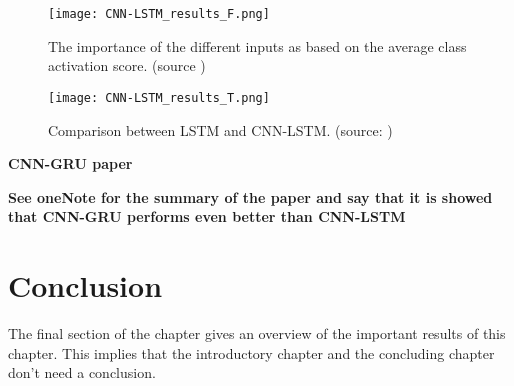 \begin{figure}[h!]
	\centering
	\texttt{[image: CNN-LSTM\_results\_F.png]}
	\caption{The importance of the different inputs as based on the average class activation score. (source \cite{Kim2019})}
	\label{tab:LSTM_lit_results}
\end{figure}

\begin{figure}[h!]
	\centering
	\texttt{[image: CNN-LSTM\_results\_T.png]}
	\caption{Comparison between LSTM and CNN-LSTM. (source: \cite{Kim2019})}
	\label{tab:LSTM_lit_results}
\end{figure}

\textbf{CNN-GRU paper}\\
\cite{Sajjad2020}

\textbf{See oneNote for the summary of the paper and say that it is showed that CNN-GRU performs even better than CNN-LSTM}


\section{Conclusion}
The final section of the chapter gives an overview of the important results
of this chapter. This implies that the introductory chapter and the
concluding chapter don't need a conclusion.



